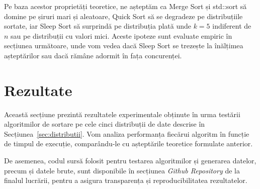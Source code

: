 \documentclass[9pt,a4paper,twocolumn,twoside]{rho-class/rho}
\begin{document}
\begin{table}[H]
    \caption{Complexitatea și proprietățile algoritmilor de sortare}
    \label{tab:complexitati}
\end{table}

Pe baza acestor proprietăți teoretice, ne așteptăm ca Merge Sort 
și std::sort să domine pe șiruri mari și aleatoare, Quick Sort să 
se degradeze pe distribuțiile sortate, iar Sleep Sort să surprindă 
pe distribuția plată unde $k = 5$ indiferent de $n$ sau pe distribuții cu valori mici. Aceste ipoteze 
sunt evaluate empiric în secțiunea următoare, unde vom vedea dacă Sleep Sort se trezește la înălțimea așteptărilor sau dacă rămâne adormit în fața concurenței.



\section{Rezultate}
\label{sec:rezultate}

    Această secțiune prezintă rezultatele experimentale obținute în urma testării algoritmilor de sortare pe cele cinci distribuții de date descrise în Secțiunea~\ref{sec:distributii}. 
    Vom analiza performanța fiecărui algoritm în funcție de timpul de execuție, comparându-le cu așteptările teoretice formulate anterior.
    \par De asemenea, codul sursă folosit pentru testarea algoritmilor și generarea datelor, precum și datele brute, sunt disponibile în secțiunea \textit{Github Repository} de la finalul lucrării, pentru a asigura transparența și reproducibilitatea rezultatelor.
\end{document}
